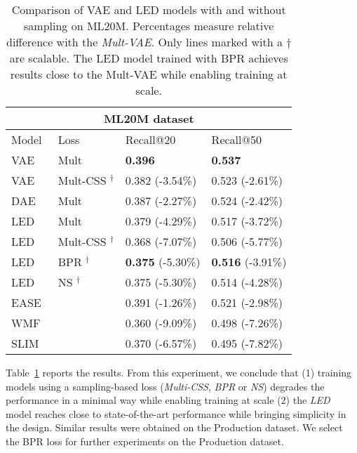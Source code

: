 \documentclass[sigconf]{acmart}
\begin{document}
\begin{table}[h]
\centering
\caption{Comparison of VAE and LED models with and without sampling on ML20M. Percentages measure relative difference with the \emph{Mult-VAE}. Only lines marked with a $\dagger$ are scalable. The LED model trained with BPR achieves results close to the Mult-VAE while enabling training at scale.}
\begin{tabularx}{.49\textwidth}{|X|X|l|l|}
  \hline
    \multicolumn{4}{|c|}{ML20M dataset} \\
  \hline
    Model & Loss & Recall@20 & Recall@50 \\
    \hline
  VAE~\cite{variational-liang-2018} & Mult & \textbf{0.396} & \textbf{0.537}   \\
  VAE & Mult-CSS $^\dagger$ &  0.382 (-3.54\%) & 0.523 (-2.61\%) \\
  DAE~\cite{variational-liang-2018} & Mult & 0.387 (-2.27\%)  & 0.524 (-2.42\%) \\
  \hline
  LED & Mult & 0.379 (-4.29\%) & 0.517 (-3.72\%) \\
  LED & Mult-CSS $^\dagger$ & 0.368 (-7.07\%) & 0.506 (-5.77\%) \\
  LED & BPR $^\dagger$ & \textbf{0.375} (-5.30\%) & \textbf{0.516}  (-3.91\%) \\
  LED & NS $^\dagger$ & 0.375 (-5.30\%) & 0.514  (-4.28\%) \\
  \hline
  EASE~\cite{ease-vae} & & 0.391 (-1.26\%) & 0.521  (-2.98\%) \\
  WMF~\cite{wmf} & & 0.360 (-9.09\%) & 0.498 (-7.26\%)\\
  SLIM~\cite{slim} & &0.370 (-6.57\%) & 0.495  (-7.82\%) \\
\hline
    \end{tabularx}
\label{table:results-sampling-loss-ml20m}
\end{table}

Table~\ref{table:results-sampling-loss-ml20m} reports the results. From this experiment, we conclude that (1) training models using a sampling-based loss (\emph{Multi-CSS}\cite{pmlr-v54-botev17a}, \emph{BPR}\cite{bpr} or \emph{NS}\cite{NIPS2013_5021}) degrades the performance in a minimal way while enabling training at scale (2) the \emph{LED} model reaches close to state-of-the-art performance while bringing simplicity in the design. Similar results were obtained on the Production dataset. We select the BPR loss for further experiments on the Production dataset.
\end{document}
